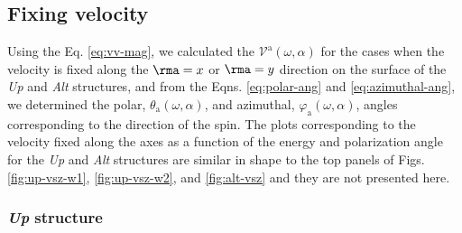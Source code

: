 \documentclass[prb,11pt,tightenlines,twocolumn,aps]{revtex4-1}
\begin{document}


\subsection{Fixing velocity} %
\label{sec:res-fixvel}



Using the Eq. \eqref{eq:vv-mag}, we calculated the $\mathcal{V}^{\mathrm{a}}
(\omega,\alpha)$ for the cases when the velocity is fixed along the $\rma=x$ or
$\rma=y$ direction on the surface of the \emph{Up} and \emph{Alt} structures,
and from the Eqns. \eqref{eq:polar-ang} and \eqref{eq:azimuthal-ang}, we
determined the polar, $\theta_{\mathrm{a}} (\omega,\alpha)$, and azimuthal,
$\varphi_{\mathrm{a}} (\omega,\alpha)$, angles corresponding to the direction
of the spin.
% 
The plots corresponding to the velocity fixed along the axes as a function of
the energy and polarization angle for the \emph{Up} and \emph{Alt} structures
are similar in shape to the top panels of Figs. \ref{fig:up-vsz-w1}, 
\ref{fig:up-vsz-w2}, and \ref{fig:alt-vsz} and they are not presented here.

\subsubsection{\emph{Up} structure}
\end{document}
